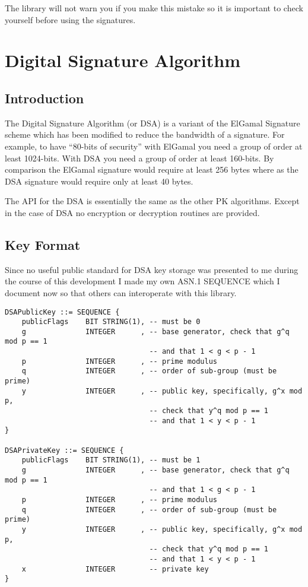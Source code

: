 \documentclass[a4paper]{book}
\begin{document}
The library will not warn you if you make this mistake so it is important to check yourself before using the 
signatures.

\chapter{Digital Signature Algorithm}
\section{Introduction}
The Digital Signature Algorithm (or DSA) is a variant of the ElGamal Signature scheme which has been modified to 
reduce the bandwidth of a signature.  For example, to have ``80-bits of security'' with ElGamal you need a group of 
order at least 1024-bits.  With DSA you need a group of order at least 160-bits.  By comparison the ElGamal signature
would require at least 256 bytes where as the DSA signature would require only at least 40 bytes.  

The API for the DSA is essentially the same as the other PK algorithms.  Except in the case of DSA no encryption or
decryption routines are provided.  

\section{Key Format}
Since no useful public standard for DSA key storage was presented to me during the course of this development I made my own ASN.1 SEQUENCE which I document
now so that others can interoperate with this library.

\begin{verbatim}
DSAPublicKey ::= SEQUENCE {
    publicFlags    BIT STRING(1), -- must be 0
    g              INTEGER      , -- base generator, check that g^q mod p == 1
                                  -- and that 1 < g < p - 1
    p              INTEGER      , -- prime modulus 
    q              INTEGER      , -- order of sub-group (must be prime)
    y              INTEGER      , -- public key, specifically, g^x mod p, 
                                  -- check that y^q mod p == 1
                                  -- and that 1 < y < p - 1
}

DSAPrivateKey ::= SEQUENCE {
    publicFlags    BIT STRING(1), -- must be 1
    g              INTEGER      , -- base generator, check that g^q mod p == 1
                                  -- and that 1 < g < p - 1
    p              INTEGER      , -- prime modulus 
    q              INTEGER      , -- order of sub-group (must be prime)
    y              INTEGER      , -- public key, specifically, g^x mod p, 
                                  -- check that y^q mod p == 1
                                  -- and that 1 < y < p - 1
    x              INTEGER        -- private key
}
\end{verbatim}
\end{document}
